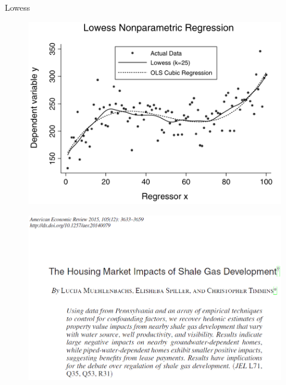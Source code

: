 \begin{frame}{Lowess}
  \begin{figure}[htbp]
  \begin{center}
  \includegraphics[width=\textwidth]{./resources/CTlowess}
  \label{loclinear2}
  \end{center}
  \end{figure}
\end{frame}

\begin{frame}
\begin{figure}[htbp]
\begin{center}
\includegraphics[width=\textwidth]{./resources/MSTAbstract}
\label{loclinear2}
\end{center}
\end{figure}
\end{frame}

